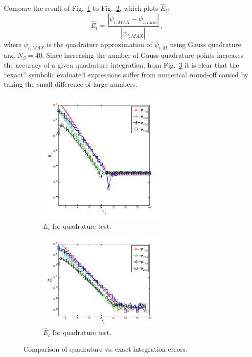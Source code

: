 \documentclass{mc2015}
\newcommand{\fig}[1]{Fig.~\ref{#1}}                      %
\newcommand{\benum}{\begin{equation}} 			%
\newcommand{\eenum}{\end{equation}}
\newcommand{\abs}[1]{\ensuremath{\left\lvert #1 \right\rvert}}
\newcommand{\pec}{\, ,}
\begin{document}
Compare the result of \fig{fig:quad_err} to \fig{fig:no_err}, which plots $\widehat{E}_i$:  
\benum
\widehat{E}_{i} = \frac{\abs{ \psi_{i,MAX} - \psi_{i,num} }}{\abs{\psi_{i,MAX} }} \pec
\eenum
where $\psi_{i,MAX}$ is the quadrature approximation of $\psi_{i,M}$ using Gauss quadrature and $N_S = 40$.
Since increasing the number of Gauss quadrature points increases the accuracy of a given quadrature integration, from \fig{fig:error_comparisons} it is clear that the ``exact'' symbolic evaluated expressions suffer from numerical round-off caused by taking the small difference of large numbers.
%
\begin{figure}[h]
\begin{center}
	\begin{subfigure}{0.45\textwidth}
		\includegraphics[width=2.5in,trim=0.5in  2.5in  1.0in 2.5in,clip=true]{err_gauss_to_matlab_exact.png}
		\caption{$E_i$ for quadrature test.}
		\label{fig:quad_err}
	\end{subfigure}
	\begin{subfigure}{0.45\textwidth}
		\includegraphics[width=2.5in,trim=0.5in  2.5in  1in 2.5in,clip=true]{err_gauss_to_highest_gauss.png}
		\caption{$\widehat{E}_i$ for quadrature test.}
		\label{fig:no_err}
	\end{subfigure}
\caption{Comparison of quadrature vs. exact integration errors.}
\label{fig:error_comparisons}
\end{center}
\end{figure}
\end{document}
